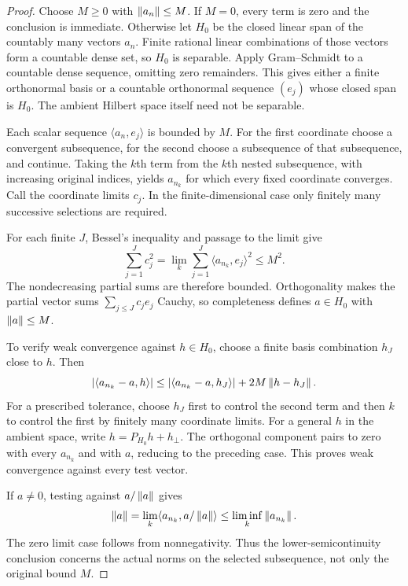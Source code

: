 \begin{proof}
Choose $M\ge0$ with $\left\lVert a_n\right\rVert\le M$. If $M=0$, every term is zero and the conclusion is immediate. Otherwise let $H_0$ be the closed linear span of the countably many vectors $a_n$. Finite rational linear combinations of those vectors form a countable dense set, so $H_0$ is separable. Apply Gram--Schmidt to a countable dense sequence, omitting zero remainders. This gives either a finite orthonormal basis or a countable orthonormal sequence $(e_j)$ whose closed span is $H_0$. The ambient Hilbert space itself need not be separable.

Each scalar sequence $\langle a_n,e_j\rangle$ is bounded by $M$. For the first coordinate choose a convergent subsequence, for the second choose a subsequence of that subsequence, and continue. Taking the $k$th term from the $k$th nested subsequence, with increasing original indices, yields $a_{n_k}$ for which every fixed coordinate converges. Call the coordinate limits $c_j$. In the finite-dimensional case only finitely many successive selections are required.

For each finite $J$, Bessel's inequality and passage to the limit give
\[
 \sum_{j=1}^Jc_j^2
 =\lim_k\sum_{j=1}^J\langle a_{n_k},e_j\rangle^2\le M^2.
\]
The nondecreasing partial sums are therefore bounded. Orthogonality makes the partial vector sums $\sum_{j\le J}c_je_j$ Cauchy, so completeness defines $a\in H_0$ with $\left\lVert a\right\rVert\le M$.

To verify weak convergence against $h\in H_0$, choose a finite basis combination $h_J$ close to $h$. Then
\[
 |\langle a_{n_k}-a,h\rangle|
 \le |\langle a_{n_k}-a,h_J\rangle|
      +2M\left\lVert h-h_J\right\rVert.
\]
For a prescribed tolerance, choose $h_J$ first to control the second term and then $k$ to control the first by finitely many coordinate limits. For a general $h$ in the ambient space, write $h=P_{H_0}h+h_\perp$. The orthogonal component pairs to zero with every $a_{n_k}$ and with $a$, reducing to the preceding case. This proves weak convergence against every test vector.

If $a\ne0$, testing against $a/\left\lVert a\right\rVert$ gives
\[
 \left\lVert a\right\rVert=\lim_k\langle a_{n_k},a/\left\lVert a\right\rVert\rangle
 \le\liminf_k\left\lVert a_{n_k}\right\rVert.
\]
The zero limit case follows from nonnegativity. Thus the lower-semicontinuity conclusion concerns the actual norms on the selected subsequence, not only the original bound $M$.
\end{proof}

